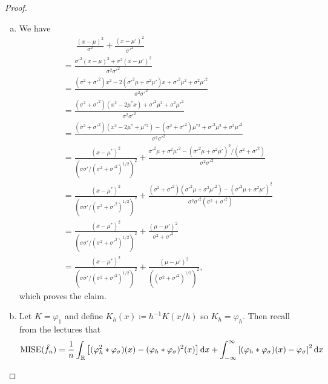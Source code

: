 \documentclass{article}
\theoremstyle{plain}
\theoremstyle{remark}
\renewcommand{\phi}{\varphi}
\newcommand{\Bb}{\mathbb}
\newcommand{\RR}{\Bb R}
\newcommand\ceq\coloneqq %
\DeclareMathOperator\MISE{MISE}
\begin{document}
\begin{proof}
	\begin{enumerate}[(a)]
		\item We have
		\begin{align*}
			&\phantom{=\ }\frac{(x-\mu)^2}{\sigma^2} + \frac{(x - \mu')^2}{\sigma'^2} \\
			&= \frac{\sigma'^2(x - \mu)^2 + \sigma^2(x - \mu')^2}{\sigma^2\sigma'^2} \\
			&= \frac{(\sigma^2 + \sigma'^2)x^2 - 2 (\sigma'^2 \mu + \sigma^2 \mu')x + \sigma'^2 \mu^2 + \sigma^2\mu'^2}{\sigma^2 \sigma'^2} \\
			&=  \frac{(\sigma^2 + \sigma'^2)(x^2 - 2\mu^*x) + \sigma'^2 \mu^2 + \sigma^2\mu'^2}{\sigma^2 \sigma'^2} \\
			&= \frac{(\sigma^2 + \sigma'^2)(x^2 - 2\mu^* + \mu^{*2}) - (\sigma^2 + \sigma'^2)\mu^{*2} + \sigma'^2 \mu^2 + \sigma^2\mu'^2}{\sigma^2 \sigma'^2} \\
			&= \frac{(x - \mu^*)^2}{(\sigma\sigma'/(\sigma^2 + \sigma'^2)^{1/2})^2} + \frac{\sigma'^2 \mu + \sigma^2 \mu'^2 - (\sigma'^2\mu + \sigma^2\mu')^2/(\sigma^2 + \sigma'^2)}{\sigma^2\sigma'^2} \\
			&= \frac{(x - \mu^*)^2}{(\sigma\sigma'/(\sigma^2 + \sigma'^2)^{1/2})^2} + \frac{(\sigma^2 + \sigma'^2)(\sigma'^2\mu + \sigma^2\mu'^2) - (\sigma'^2\mu + \sigma^2\mu')^2}{\sigma^2 \sigma'^2(\sigma^2 + \sigma'^2)} \\
			&= \frac{(x - \mu^*)^2}{(\sigma\sigma'/(\sigma^2 + \sigma'^2)^{1/2})^2} + \frac{(\mu - \mu')^2}{\sigma^2 + \sigma'^2} \\
			&= \frac{(x - \mu^*)^2}{(\sigma\sigma'/(\sigma^2 + \sigma'^2)^{1/2})^2} + \frac{(\mu - \mu')^2}{((\sigma^2 + \sigma'^2)^{1/2})^2}, 
		\end{align*}
	which proves the claim. 
	\item Let $K = \phi_1$ and define $K_h(x) \ceq h^{-1} K(x/h)$ so $K_h = \phi_h$. Then recall from the lectures that
	\[
	\MISE(\hat f_n) = \frac1n \int_\RR \qty[(\phi_h^2 * \phi_\sigma)(x) - (\phi_h * \phi_\sigma)^2(x)] \dd{x} + \int_{-\infty}^\infty \qty[ (\phi_h * \phi_\sigma)(x) - \phi_\sigma]^2 \dd{x}
	\]
	\end{enumerate}
\end{proof}
\end{document}
